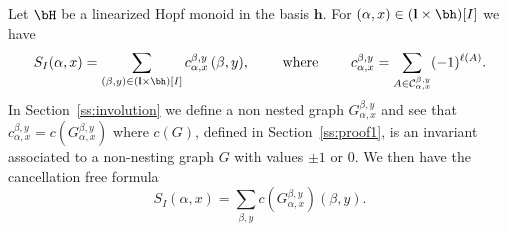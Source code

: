 \begin{theorem}\label{thm:antiLxP} Let $\bH$ be a linearized Hopf monoid in the basis $\mathbf{h}$. For $(\alpha, x)\in(\mathbf{l}\times\bh)[I]$ we have
$$ S_I(\alpha,x) = \sum_{(\beta,y)\in (\mathbf{l}\times\bh)[I]} c_{\alpha,x}^{\beta,y} \,(\beta,y),
\qquad\text{ where }\qquad
 c_{\alpha,x}^{\beta,y}=\sum_{A\in \mathcal{C}_{\alpha,x}^{\beta,y}} (-1)^{\ell(A)}.$$
 In Section~\ref{ss:involution} we define a non nested graph $G_{\alpha,x}^{\beta,y}$ and see that $c_{\alpha,x}^{\beta,y}=c(G_{\alpha,x}^{\beta,y})$ where $c(G)$, defined in Section~\ref{ss:proof1}, is an invariant associated to a non-nesting graph $G$
 with values $\pm1 \text{ or } 0$. We then have the cancellation free formula
 \begin{equation}\label{eq:thm1}
 S_I(\alpha,x) = \sum_{\beta, y} c(G_{\alpha,x}^{\beta,y}) (\beta,y).
\end{equation}
\end{theorem}
